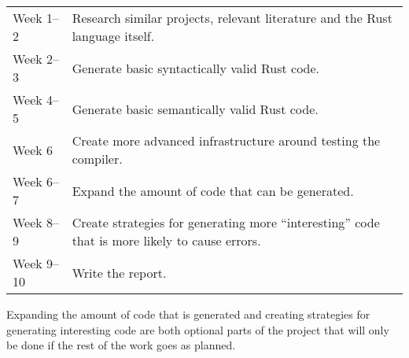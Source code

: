 \documentclass{article}
\begin{document}
\begin{tabular}{p{} p{}}
    Week 1--2  & Research similar projects, relevant literature and the Rust language itself. \\
    Week 2--3  & Generate basic syntactically valid Rust code. \\
    Week 4--5  & Generate basic semantically valid Rust code. \\
    Week 6     & Create more advanced infrastructure around testing the compiler. \\
    Week 6--7  & Expand the amount of code that can be generated. \\
    Week 8--9  & Create strategies for generating more ``interesting'' code that is more likely to cause errors. \\
    Week 9--10 & Write the report. \\
\end{tabular}

Expanding the amount of code that is generated and creating strategies for generating interesting code are both optional parts of the project that will only be done if the rest of the work goes as planned.

\printbibliography{}
\end{document}
